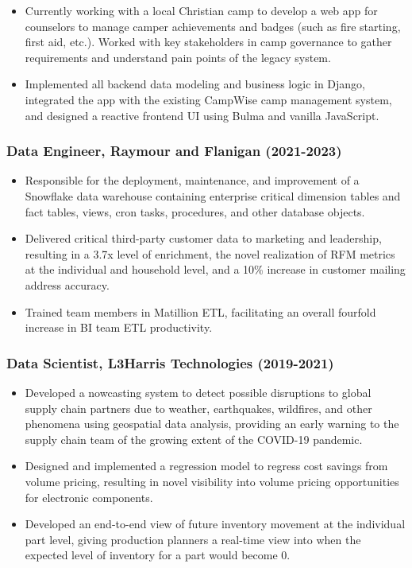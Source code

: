 \documentclass[10pt]{article}
\begin{document}
\begin{itemize}
	\setlength{\itemsep}{1pt}
	\setlength{\parskip}{0pt}
	\setlength{\parsep}{0pt}
	\item Currently working with a local Christian camp to develop a web app for counselors to manage camper achievements and badges (such as fire starting, first aid, etc.). Worked with key stakeholders in camp governance to gather requirements and understand pain points of the legacy system.
	\item Implemented all backend data modeling and business logic in Django, integrated the app with the existing CampWise camp management system, and designed a reactive frontend UI using Bulma and vanilla JavaScript.
\end{itemize}


\subsubsection*{Data Engineer, Raymour and Flanigan (2021-2023)}
\begin{itemize}
	\setlength{\itemsep}{1pt}
	\setlength{\parskip}{0pt}
	\setlength{\parsep}{0pt}
\item Responsible for the deployment, maintenance, and improvement of a Snowflake data warehouse containing enterprise critical dimension tables and fact tables, views, cron tasks, procedures, and other database objects. 
\item Delivered critical third-party customer data to marketing and leadership, resulting in a 3.7x level of enrichment, the novel realization of RFM metrics at the individual and household level, and a 10\% increase in customer mailing address accuracy.
\item Trained team members in Matillion ETL, facilitating an overall fourfold increase in BI team ETL productivity.
\end{itemize}

\subsubsection*{Data Scientist, L3Harris Technologies (2019-2021)}
\begin{itemize}
	\setlength{\itemsep}{1pt}
	\setlength{\parskip}{0pt}
	\setlength{\parsep}{0pt}
\item Developed a nowcasting system to detect possible disruptions to global supply chain partners due to weather, earthquakes, wildfires, and other phenomena using geospatial data analysis, providing an early warning to the supply chain team of the growing extent of the COVID-19 pandemic. 
\item Designed and implemented a regression model to regress cost savings from volume pricing, resulting in novel visibility into volume pricing opportunities for electronic components. 
\item Developed an end-to-end view of future inventory movement at the individual part level, giving production planners a real-time view into when the expected level of inventory for a part would become 0.
\end{itemize}
\end{document}
